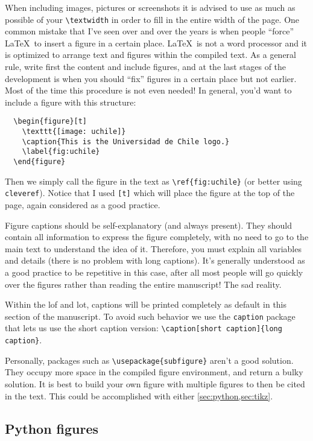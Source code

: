 When including images, pictures or screenshots it is advised to use as much as possible of your \verb|\textwidth| in order to fill in the entire width of the page. One common mistake that I've seen over and over the years is when people ``force'' \LaTeX\ to insert a figure in a certain place. \LaTeX\ is not a word processor and it is optimized to arrange text and figures within the compiled text. As a general rule, write first the content and include figures, and at the last stages of the development is when you should ``fix'' figures in a certain place but not earlier. Most of the time this procedure is not even needed!
In general, you'd want to include a figure with this structure:
\begin{verbatim}
  \begin{figure}[t]
    \texttt{[image: uchile]}
    \caption{This is the Universidad de Chile logo.}
    \label{fig:uchile}
  \end{figure}
\end{verbatim}
Then we simply call the figure in the text as \verb|\ref{fig:uchile}| (or better using \texttt{cleveref}). Notice that I used \texttt{[t]} which will place the figure at the top of the page, again considered as a good practice.

Figure captions should be self-explanatory (and always present). They should contain all information to express the figure completely, with no need to go to the main text to understand the idea of it. Therefore, you must explain all variables and details (there is no problem with long captions). It's generally understood as a good practice to be repetitive in this case, after all most people will go quickly over the figures rather than reading the entire manuscript! The sad reality.

Within the \gls{lof} and \gls{lot}, captions will be printed completely as default in this section of the manuscript. To avoid such behavior we use the \texttt{caption} package that lets us use the short caption version: \verb|\caption[short caption]{long caption}|.

Personally, packages such as \verb|\usepackage{subfigure}| aren't a good solution. They occupy more space in the compiled figure environment, and return a bulky solution. It is best to build your own figure with multiple figures to then be cited in the text. This could be accomplished with either \cref{sec:python,sec:tikz}.

\subsection{Python figures}
\label{sec:python}

